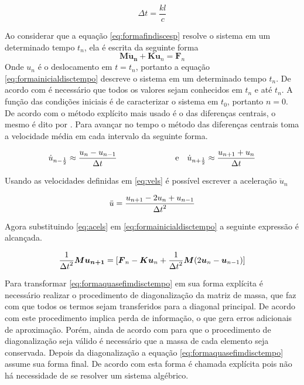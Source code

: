 \begin{equation}
\Delta t = \frac{k l }{c}
\label{eq:defdeltat}
\end{equation}

Ao considerar que a equação \ref{eq:formafindiscesp} resolve o sistema em um determinado tempo $t_n$, ela é escrita da seguinte forma
    \begin{equation} \label{eq:formainicialdisctempo}
    \boldsymbol{M \ddot{u}_n } + \boldsymbol{K}\boldsymbol{u}_n = \boldsymbol{F}_n
\end{equation}
Onde $ u_n $ é o deslocamento em $t=t_n$, portanto a equação \ref{eq:formainicialdisctempo} descreve o sistema em um determinado tempo $t_n $. De acordo com \cite{Paulo} é necessário que todos os valores sejam conhecidos em $t_n$ e até $ t_n $. A função das condições iniciais é de caracterizar o sistema em $ t_0 $, portanto $n=0$. De acordo com \cite{Paulo} o método explícito mais usado é o das diferenças centrais, o mesmo é dito por \cite{theorymanls}. Para avançar no tempo o método das diferenças centrais toma a velocidade média em cada intervalo da seguinte forma.

\begin{align} \label{eq:vels}
    \dot{u}_{n-\frac{1}{2}} \approx \ddfrac{u_n - u_{n-1}}{\Delta t} & \hspace{25mm} \text{e} & \dot{u}_{n+\frac{1}{2}} \approx \ddfrac{ u_{n+1} + u_n}{\Delta t} 
\end{align} 

Usando as velocidades definidas em \ref{eq:vels} é possível escrever a aceleração $ \ddot{u}_n $ 

\begin{equation} \label{eq:acels}
    \ddot{u} = \frac{\displaystyle u_{n+1} - 2u_n + u_{n-1}}{\displaystyle \Delta t^2}
\end{equation}

Agora substituindo \ref{eq:acels} em \ref{eq:formainicialdisctempo} a seguinte expressão é alcançada.

\begin{equation} \label{eq:formaquasefimdisctempo}
    \frac{\displaystyle 1}{\displaystyle \Delta t^2}\boldsymbol{M} \boldsymbol{u_{n+1}} = [\boldsymbol{F}_n - \boldsymbol{Ku}_n + \frac{\displaystyle 1}{\displaystyle \Delta t^2}\boldsymbol{M}(2\boldsymbol{u}_n - \boldsymbol{u}_{n-1}) ]
\end{equation}

Para transformar \ref{eq:formaquasefimdisctempo} em sua forma explícita é necessário realizar o procedimento de diagonalização da matriz de massa, que faz com que todos os termos sejam transferidos para a diagonal principal. De acordo com \cite{Paulo} este procedimento implica perda de informação, o que gera erros adicionais de aproximação. Porém, ainda de acordo com \cite{Paulo} para que o procedimento de diagonalização seja válido é necessário que a massa de cada elemento seja conservada. Depois da diagonalização a equação \ref{eq:formaquasefimdisctempo} assume sua forma final. De acordo com \cite{Paulo} esta forma é chamada explícita pois não há necessidade de se resolver um sistema algébrico.

